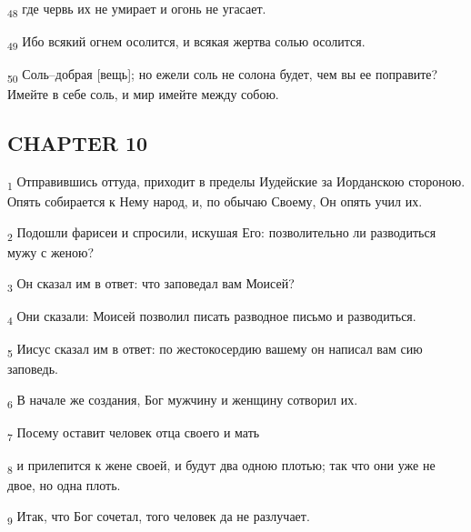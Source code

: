 \begin{tcolorbox}
\textsubscript{48} где червь их не умирает и огонь не угасает.
\end{tcolorbox}
\begin{tcolorbox}
\textsubscript{49} Ибо всякий огнем осолится, и всякая жертва солью осолится.
\end{tcolorbox}
\begin{tcolorbox}
\textsubscript{50} Соль--добрая [вещь]; но ежели соль не солона будет, чем вы ее поправите? Имейте в себе соль, и мир имейте между собою.
\end{tcolorbox}
\subsection{CHAPTER 10}
\begin{tcolorbox}
\textsubscript{1} Отправившись оттуда, приходит в пределы Иудейские за Иорданскою стороною. Опять собирается к Нему народ, и, по обычаю Своему, Он опять учил их.
\end{tcolorbox}
\begin{tcolorbox}
\textsubscript{2} Подошли фарисеи и спросили, искушая Его: позволительно ли разводиться мужу с женою?
\end{tcolorbox}
\begin{tcolorbox}
\textsubscript{3} Он сказал им в ответ: что заповедал вам Моисей?
\end{tcolorbox}
\begin{tcolorbox}
\textsubscript{4} Они сказали: Моисей позволил писать разводное письмо и разводиться.
\end{tcolorbox}
\begin{tcolorbox}
\textsubscript{5} Иисус сказал им в ответ: по жестокосердию вашему он написал вам сию заповедь.
\end{tcolorbox}
\begin{tcolorbox}
\textsubscript{6} В начале же создания, Бог мужчину и женщину сотворил их.
\end{tcolorbox}
\begin{tcolorbox}
\textsubscript{7} Посему оставит человек отца своего и мать
\end{tcolorbox}
\begin{tcolorbox}
\textsubscript{8} и прилепится к жене своей, и будут два одною плотью; так что они уже не двое, но одна плоть.
\end{tcolorbox}
\begin{tcolorbox}
\textsubscript{9} Итак, что Бог сочетал, того человек да не разлучает.
\end{tcolorbox}
